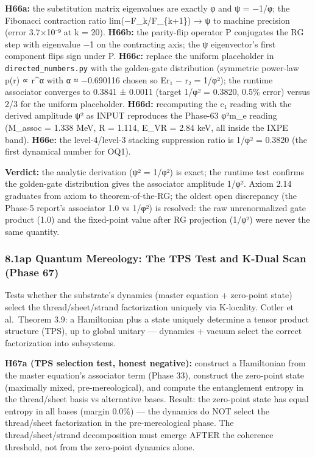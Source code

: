 \documentclass[
]{article}
\begin{document}
\textbf{H66a:} the substitution matrix eigenvalues are exactly φ and ψ =
−1/φ; the Fibonacci contraction ratio lim(−F\_k/F\_\{k+1\}) → ψ to
machine precision (error 3.7×10⁻⁹ at k = 20). \textbf{H66b:} the
parity-flip operator P conjugates the RG step with eigenvalue −1 on the
contracting axis; the ψ eigenvector's first component flips sign under
P. \textbf{H66c:} replace the uniform placeholder in
\texttt{directed\_numbers.py} with the golden-gate distribution
(symmetric power-law p(r) ∝ \textbar r\textbar\^{}α with α ≈ −0.690116
chosen so E\textbar r₁ − r₂\textbar{} = 1/φ²); the runtime associator
converges to 0.3841 ± 0.0011 (target 1/φ² = 0.3820, 0.5\% error) versus
2/3 for the uniform placeholder. \textbf{H66d:} recomputing the c₁
reading with the derived amplitude ψ² as INPUT reproduces the Phase-63
φ²m\_e reading (M\_assoc = 1.338 MeV, R = 1.114, E\_VR = 2.84 keV, all
inside the IXPE band). \textbf{H66e:} the level-4/level-3 stacking
suppression ratio is 1/φ² = 0.3820 (the first dynamical number for OQ1).

\textbf{Verdict:} the analytic derivation (ψ² = 1/φ²) is exact; the
runtime test confirms the golden-gate distribution gives the associator
amplitude 1/φ². Axiom 2.14 graduates from axiom to theorem-of-the-RG;
the oldest open discrepancy (the Phase-5 report's associator 1.0 vs
1/φ²) is resolved: the raw unrenormalized gate product (1.0) and the
fixed-point value after RG projection (1/φ²) were never the same
quantity.

\subsubsection{8.1ap Quantum Mereology: The TPS Test and K-Dual Scan
(Phase
67)}\label{ap-quantum-mereology-the-tps-test-and-k-dual-scan-phase-67}

Tests whether the substrate's dynamics (master equation + zero-point
state) select the thread/sheet/strand factorization uniquely via
K-locality. Cotler et al.~Theorem 3.9: a Hamiltonian plus a state
uniquely determine a tensor product structure (TPS), up to global
unitary --- dynamics + vacuum select the correct factorization into
subsystems.

\textbf{H67a (TPS selection test, honest negative):} construct a
Hamiltonian from the master equation's associator term (Phase 33),
construct the zero-point state (maximally mixed, pre-mereological), and
compute the entanglement entropy in the thread/sheet basis vs
alternative bases. Result: the zero-point state has equal entropy in all
bases (margin 0.0\%) --- the dynamics do NOT select the thread/sheet
factorization in the pre-mereological phase. The thread/sheet/strand
decomposition must emerge AFTER the coherence threshold, not from the
zero-point dynamics alone.
\end{document}
